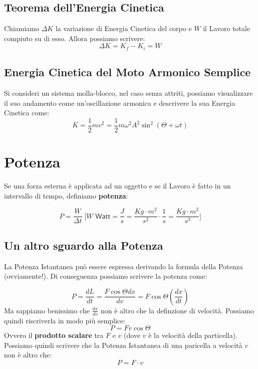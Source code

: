         \subsection{Teorema dell'Energia Cinetica} Chiamiamo $\Delta K$ la 
        variazione di Energia Cinetica del corpo e $W$ il Lavoro totale 
        compiuto su di esso. Allora possiamo scrivere:
        \begin{equation}
            \Delta K = K_f - K_i = W
        \end{equation}

        \subsection{Energia Cinetica del Moto Armonico Semplice} Si consideri un
        sistema molla-blocco, nel caso senza attriti, possiamo visualizzare il 
        suo andamento come un'oscillazione armonica e descrivere la sua Energia
        Cinetica come:
        \begin{equation}
            K = \frac{1}{2}mv^2 = \frac{1}{2}m\omega^2A^2\sin^2
            (\Theta + \omega t)
        \end{equation}

    
    \section{Potenza} Se una forza esterna è applicata ad un oggetto e se il 
    Lavoro è fatto in un intervallo di tempo, definiamo \textbf{potenza}:
        
        \begin{equation}
            P = \frac{W}{\Delta t} \; \Bigg[W \textsf{  Watt} = \frac{J}{s} 
            = \frac{Kg \cdot m^2}{s^2} \cdot \frac{1}{s} 
            = \frac{Kg \cdot m^2}{s^3} \Bigg]
        \end{equation}

        \subsection{Un altro sguardo alla Potenza} La Potenza Istantanea può 
        essere espressa derivando la formula della Potenza (ovviamente!). Di 
        conseguenza possiamo scrivere la potenza come:

        \begin{equation*}
            P = \frac{dL}{dt} = \frac{F \cos \Theta dx}{dv} 
            = F \cos \Theta (\frac{dx}{dt})
        \end{equation*}
        Ma sappiamo benissimo che $\frac{dx}{dv}$ non è altro che la definzione 
        di velocità. Possiamo quindi riscriverla in modo più semplice:
        \begin{equation*}
            P = Fv\cos\Theta
        \end{equation*}
        Ovvero il \textbf{prodotto scalare} tra $F$ e $v$ (dove $v$ è la 
        velocità della particella). Possiamo quindi scrivere che la Potenza 
        Istantanea di una paricella a velocità $v$ non è altro che:
        \begin{equation}
            P = F \cdot v
        \end{equation}

